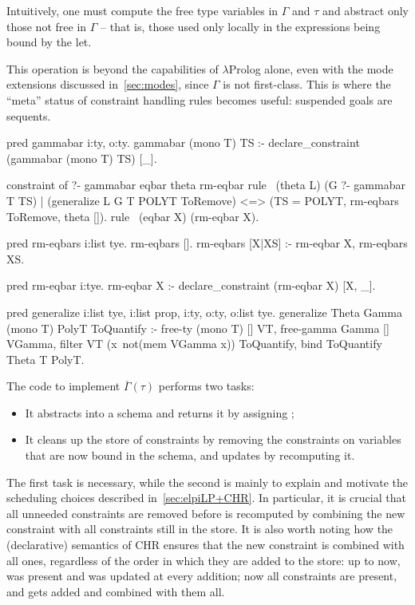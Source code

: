 \documentclass[a4paper, 11pt]{book}
\begin{document}
Intuitively, one must compute the free type variables in $\Gamma$ and $\tau$
and abstract only those not free in $\Gamma$ -- that is, those used only locally
in the expressions being bound by the let.

This operation is beyond the capabilities of $\lambda$Prolog alone, even with
the mode extensions discussed in~\cref{sec:modes}, since $\Gamma$ is not
first-class.
This is where the ``meta'' status of constraint handling rules becomes useful:
suspended goals are sequents.

\begin{elpicode}
pred gammabar i:ty, o:ty.
gammabar (mono T) TS :- declare_constraint (gammabar (mono T) TS) [_].

constraint of ?- gammabar eqbar theta rm-eqbar {
  rule  \ (theta L)
          (G ?- gammabar T TS)              %
        | (generalize L G T POLYT ToRemove) %
      <=> (TS = POLYT, rm-eqbars ToRemove, theta []). %
  rule \ (eqbar X) (rm-eqbar X).
}

pred rm-eqbars i:list tye.
rm-eqbars [].
rm-eqbars [X|XS] :- rm-eqbar X, rm-eqbars XS.

pred rm-eqbar i:tye.
rm-eqbar X :- declare_constraint (rm-eqbar X) [X, _].

pred generalize i:list tye, i:list prop, i:ty, o:ty, o:list tye.
generalize Theta Gamma (mono T) PolyT ToQuantify :-
  free-ty (mono T) [] VT,
  free-gamma Gamma [] VGamma,
  filter VT (x\ not(mem VGamma x)) ToQuantify,
  bind ToQuantify Theta T PolyT.
\end{elpicode}

\noindent
The code to implement $\overline{\Gamma}(\tau)$ performs two tasks:

\begin{itemize}
  \item It abstracts  into a schema  and returns it by
    assigning ;
  \item It cleans up the store of constraints by removing the 
    constraints on variables that are now bound in the schema, and updates
     by recomputing it.
\end{itemize}

The first task is necessary, while the second is mainly to explain and
motivate the scheduling choices described in~\cref{sec:elpiLP+CHR}. In
particular, it is crucial that all unneeded  constraints are
removed before  is recomputed by combining the new constraint
with all  constraints still in the store. It is also worth
noting how the (declarative) semantics of CHR ensures that the new
 constraint is combined with all  ones, regardless
of the order in which they are added to the store: up to now, 
was present and was updated at every  addition; now all
 constraints are present, and  gets added and
combined with them all.
\end{document}
